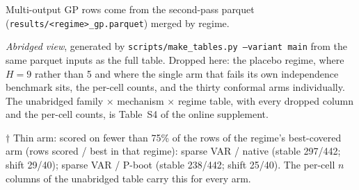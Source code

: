 \begin{table}[tbp]
\begin{threeparttable}
\begin{tablenotes}
\item Multi-output GP rows come from the second-pass parquet (\texttt{results/<regime>\_gp.parquet}) merged by regime.
\item \emph{Abridged view}, generated by \texttt{scripts/make\_tables.py --variant main} from the same parquet inputs as the full table. Dropped here: the placebo regime, where $H=9$ rather than 5 and where the single arm that fails its own independence benchmark sits, the per-cell counts, and the thirty conformal arms individually. The unabridged family $\times$ mechanism $\times$ regime table, with every dropped column and the per-cell counts, is Table~S4 of the online supplement.
\item $\dagger$ Thin arm: scored on fewer than 75\% of the rows of the regime's best-covered arm (rows scored / best in that regime): sparse VAR / native (stable 297/442; shift 29/40); sparse VAR / P-boot (stable 238/442; shift 25/40). The per-cell $n$ columns of the unabridged table carry this for every arm.
\end{tablenotes}
\end{threeparttable}
\end{table}
